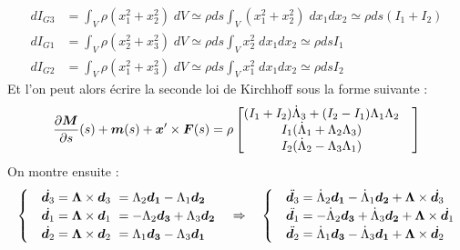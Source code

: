 \begin{subequations}
	\begin{align}
		dI_{G3} &= \int_V \rho (x_1^2+ x_2^2)\;dV
		\simeq \rho ds \int_V (x_1^2+x_2^2)\;dx_1dx_2
		\simeq \rho ds (I_1 + I_2)
		\\
		dI_{G1} &= \int_V \rho (x_2^2+ x_3^2)\;dV
		\simeq \rho ds \int_V x_2^2\;dx_1dx_2
		\simeq \rho ds I_1
		\\
		dI_{G2} &= \int_V \rho (x_1^2+ x_3^2)\;dV
		\simeq \rho ds \int_V x_1^2\;dx_1dx_2
		\simeq \rho ds I_2
	\end{align}
\end{subequations}
Et l'on peut alors écrire la seconde loi de Kirchhoff sous la forme suivante :
\begin{equation}
	\begin{aligned}
		\frac{\partial \boldsymbol{M}}{\partial s}(s)+\boldsymbol{m}(s) + \boldsymbol{x}'\times \boldsymbol{F}(s)
		= \rho
			\begin{bmatrix}
				(I_1 + I_2)\dot{\Lambda}_3 + (I_2 - I_1)\Lambda_1\Lambda_2&\\
				I_1 (\dot{\Lambda}_1 + \Lambda_2 \Lambda_3) &\\
				I_2 (\dot{\Lambda}_2 - \Lambda_3 \Lambda_1) &
			\end{bmatrix}
	\end{aligned}
\end{equation}
On montre ensuite :
\begin{equation}
\begin{cases}
&\dot{\boldsymbol{d}_3} 	= \boldsymbol{\Lambda}\times \boldsymbol{d}_3\  
				= \Lambda_2\boldsymbol{d_1} - \Lambda_1\boldsymbol{d_2}\\
&\dot{\boldsymbol{d}_1} 	= \boldsymbol{\Lambda}\times \boldsymbol{d}_1\  
				= -\Lambda_2\boldsymbol{d_3} + \Lambda_3\boldsymbol{d_2}\\
&\dot{\boldsymbol{d}_2} 	= \boldsymbol{\Lambda}\times \boldsymbol{d}_2\  
				= \Lambda_1\boldsymbol{d_3} - \Lambda_3\boldsymbol{d_1}\\
\end{cases}
\quad\Rightarrow\quad
\begin{cases}
&\ddot{\boldsymbol{d}_3} 	= \dot{\Lambda}_2\boldsymbol{d_1} - \dot{\Lambda}_1\boldsymbol{d_2} 
				+ \boldsymbol{\Lambda} \times \dot{\boldsymbol{d}_3}\\
&\ddot{\boldsymbol{d}_1} 	= -\dot{\Lambda}_2\boldsymbol{d_3} + \dot{\Lambda}_3\boldsymbol{d_2}
				+ \boldsymbol{\Lambda} \times \dot{\boldsymbol{d}_1}\\
&\ddot{\boldsymbol{d}_2} 	= \dot{\Lambda}_1\boldsymbol{d_3} - \dot{\Lambda}_3\boldsymbol{d_1}
				+ \boldsymbol{\Lambda} \times \dot{\boldsymbol{d}_2}		
\end{cases}
\end{equation}
